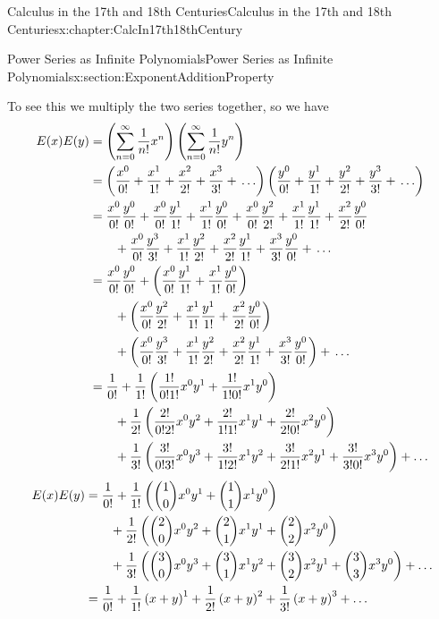\begin{chapterptx}{Calculus in the 17th and 18th Centuries}{}{Calculus in the 17th and 18th Centuries}{}{}{x:chapter:CalcIn17th18thCentury}
\begin{sectionptx}{Power Series as Infinite Polynomials}{}{Power Series as Infinite Polynomials}{}{}{x:section:ExponentAdditionProperty}
		\par
		To see this we multiply the two series together, so we have%
		\begin{align*}
			E(x)E(y) \amp =\left(\sum_{n=0}^\infty\frac{1}{n!}x^n\right)\left(\sum_{n=0}^\infty\frac{1}{n!}y^n\right)\\
			\amp =\left(\frac{x^0}{0!}+\frac{x^1}{1!}+\frac{x^2}{2!}+\frac{x^3}{3!}+\,\ldots\right)\left(\frac{y^0}{0!}+\frac{y^1}{1!}+\frac{y^2}{2!}+\frac{y^3}{3!}+\,\ldots\right)\\
			\amp =\frac{x^0}{0!}\frac{y^0}{0!}+\frac{x^0}{0!}\frac{y^1}{1!}+\frac{x^1}{1!}\frac{y^0}{0!}+\frac{x^0}{0!}\frac{y^2}{2!}+\frac{x^1}{1!}\frac{y^1}{1!}+\frac{x^2}{2!}\frac{y^0}{0!}\\
			\amp \ \ \ \ \ \  +\frac{x^0}{0!}\frac{y^3}{3!}+\frac{x^1}{1!}\frac{y^2}{2!}+\frac{x^2}{2!}\frac{y^1}{1!}+\frac{x^3}{3!}\frac{y^0}{0!}+\,\ldots\\
			\amp =\frac{x^0}{0!}\frac{y^0}{0!}+\left(\frac{x^0}{0!}\frac{y^1}{1!}+ \frac{x^1}{1!}\frac{y^0}{0!}\right)\\
			\amp \ \ \ \ \ \  +\left(\frac{x^0}{0!}\frac{y^2}{2!}+\frac{x^1}{1!}\frac{y^1}{1!}+\frac{x^2}{2!}\frac{y^0}{0!}\right)\\
			\amp \ \ \ \ \ \ +\left(\frac{x^0}{0!}\frac{y^3}{3!}+\frac{x^1}{1!}\frac{y^2}{2!}+\frac{x^2}{2!}\frac{y^1}{1!}+\frac{x^3}{3!}\frac{y^0}{0!}\right)+\,\ldots\\
			\amp =\frac{1}{0!}+\frac{1}{1!}\left(\frac{1!}{0!1!}x^0y^1+\frac{1!}{1!0!}x^1y^0\right)\\
			\amp \ \ \ \ \ \ +\frac{1}{2!}\left(\frac{2!}{0!2!}x^0y^2+\frac{2!}{1!1!}x^1y^1+\frac{2!}{2!0!}x^2y^0\right)\\
			\amp \ \ \ \ \ \ +\frac{1}{3!}\left(\frac{3!}{0!3!}x^0y^3+\frac{3!}{1!2!}x^1y^2+\frac{3!}{2!1!}x^2y^1+\frac{3!}{3!0!}x^3y^0\right)+\ldots
		\end{align*}
		\begin{align}
			E(x)E(y) \amp =\frac{1}{0!}+\frac{1}{1!}\left(\binom{1}{0}x^0y^1+\binom{1}{1}x^1y^0\right)\notag\\
			\amp \ \ \ \ \ \ +\frac{1}{2!}\left(\binom{2}{0}x^0y^2+\binom{2}{1}x^1y^1+\binom{2}{2}x^2y^0\right)\notag\\
			\amp \ \ \ \ \ \ +\frac{1}{3!}\left(\binom{3}{0}x^0y^3+\binom{3}{1}x^1y^2+\binom{3}{2}x^2y^1+\binom{3}{3}x^3y^0\right)+\ldots\notag\\
			\amp =\frac{1}{0!}+\frac{1}{1!}\left(x+y\right)^1+\frac{1}{2!}\left(x+y\right)^2+\frac{1}{3!}\left(x+y\right)^3+\ldots\notag\\

\end{align}
\end{sectionptx}
\end{chapterptx}
